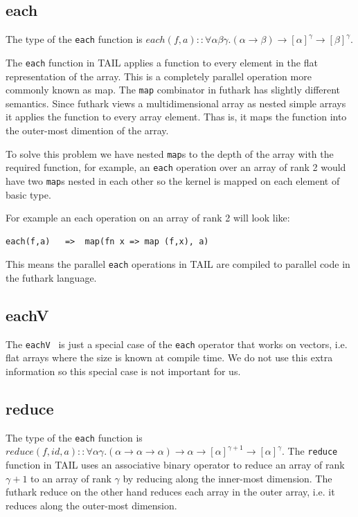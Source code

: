 \documentclass[11pt]{article}
\begin{document}
\subsection{each}
The type of the {\tt each} function is $each(f,a) :: \forall\alpha\beta\gamma.(\alpha \to \beta) \to [\alpha]^\gamma \to [\beta]^\gamma$.

The {\tt each} function in TAIL applies a function to every element in the flat representation of the array. This is a completely parallel operation more commonly known as map. The {\tt map} combinator in futhark has slightly different semantics.
Since futhark views a multidimensional array as nested simple arrays it applies the function to every array element.
Thas is, it maps the function into the outer-most dimention of the array.

To solve this problem we have nested {\tt map}s to the depth of the array with the required function, for example, an {\tt each} operation over an array of rank 2 would have two {\tt map}s nested in each other so the kernel is mapped on each element of basic type.

For example an each operation on an array of rank 2 will look like:
\begin{lstlisting}[numbers=none,frame=none]
each(f,a)	=>	map(fn x => map (f,x), a)
\end{lstlisting}

This means the parallel {\tt each} operations in TAIL are compiled to parallel code in the futhark language.

\subsection{eachV}
The {\tt eachV } is just a special case of the {\tt each} operator that works on vectors, i.e. flat arrays where the size
is known at compile time. We do not use this extra information so this special case is not important for us.

\subsection{reduce}
The type of the {\tt each} function is $reduce(f,id,a) :: \forall\alpha\gamma.(\alpha \to \alpha \to \alpha) \to \alpha \to [\alpha]^{\gamma+1} \to [\alpha]^\gamma$.
The {\tt reduce} function in TAIL uses an associative binary operator to reduce an array of rank $\gamma+1$ to an array of rank $\gamma$ by reducing along the inner-most dimension. The futhark reduce on the other hand reduces each array in the outer array, i.e. it reduces along the outer-most dimension. 
\end{document}
